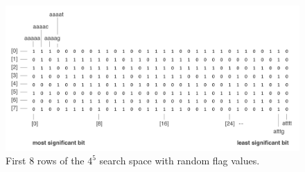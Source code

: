 \begin{figure}[h]
	\centering
	\includegraphics[width=5in]{contents/00_images/search_space}\vspace*{5pt}
	\caption{First 8 rows of the $4^{5}$ search space with random flag values.}
	\label{fig:search_space}
\end{figure}